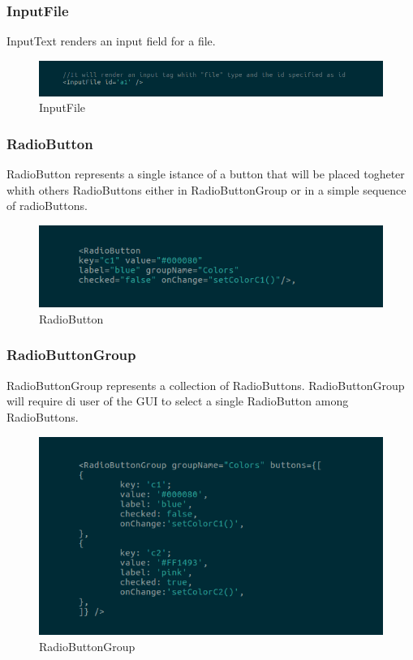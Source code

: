 \subsubsection{InputFile}
InputText renders an input field for a file.
\begin{figure}[H]
	\centering
	\includegraphics[width=14cm]{../../documenti/UserManualFramework/framework_view/17framework_view_inputfile.png}
	\caption{InputFile}
\end{figure}

\subsubsection{RadioButton}
RadioButton represents a single istance of a button that will be placed togheter whith others RadioButtons either in RadioButtonGroup or in a simple sequence of radioButtons.
\begin{figure}[H]
	\centering
	\includegraphics[width=14cm]{../../documenti/UserManualFramework/framework_view/7framework_view_radio.png}
	\caption{RadioButton}
\end{figure}

\subsubsection{RadioButtonGroup}
RadioButtonGroup represents a collection of RadioButtons.
RadioButtonGroup will require di user of the GUI to select a single RadioButton among RadioButtons.
\begin{figure}[H]
	\centering
	\includegraphics[width=14cm]{../../documenti/UserManualFramework/framework_view/8framework_view_radio_group.png}
	\caption{RadioButtonGroup}
\end{figure}

